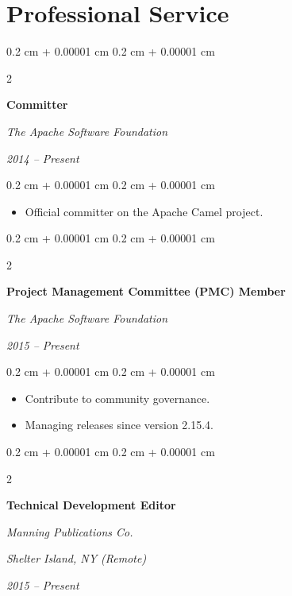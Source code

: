 \documentclass[10pt, a4paper]{article}
\newenvironment{highlights}{
    \begin{itemize}[
        topsep=0.10 cm,
        parsep=0.10 cm,
        partopsep=0pt,
        itemsep=0pt,
        leftmargin=0.4 cm + 10pt
    ]
}{
    \end{itemize}
} %
\newenvironment{onecolentry}{
    \begin{adjustwidth}{
        0.2 cm + 0.00001 cm
    }{
        0.2 cm + 0.00001 cm
    }
}{
    \end{adjustwidth}
} %
\newenvironment{twocolentry}[2][]{
    \onecolentry
    \def\secondColumn{#2}
    \setcolumnwidth{\fill, 8 cm}
    \begin{paracol}{2}
}{
    \switchcolumn \raggedleft \secondColumn
    \end{paracol}
    \endonecolentry
} %
\begin{document}
\vspace{0.20 cm}



\section{Professional Service}
\begin{twocolentry}{
        \textit{2014 – Present}}
    \textbf{Committer}

    \textit{The Apache Software Foundation}
\end{twocolentry}

\vspace{0.10 cm}
\begin{onecolentry}
    \begin{highlights}
        \item Official committer on the Apache Camel project.
    \end{highlights}
\end{onecolentry}

\vspace{0.20 cm}

\begin{twocolentry}{
        \textit{2015 – Present}}
    \textbf{Project Management Committee (PMC) Member}

    \textit{The Apache Software Foundation}
\end{twocolentry}

\vspace{0.10 cm}
\begin{onecolentry}
    \begin{highlights}
        \item Contribute to community governance.
        \item Managing releases since version 2.15.4.
    \end{highlights}
\end{onecolentry}

\vspace{0.20 cm}

\begin{twocolentry}{
        \textit{Shelter Island, NY (Remote)}

        \textit{2015 – Present}}
    \textbf{Technical Development Editor}

    \textit{Manning Publications Co.}
\end{twocolentry}
\end{document}
